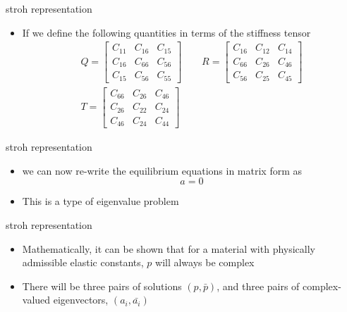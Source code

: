 \documentclass[
  letterpaper,
  ignorenonframetext,
  aspectratio=43,
  handout,
  12pt]{beamer}
\providecommand{\tightlist}{%
  \setlength{\itemsep}{0pt}\setlength{\parskip}{0pt}}
\providecommand{\tightlist}{%
\setlength{\itemsep}{0pt}\setlength{\parskip}{0pt}}
\begin{document}
\begin{frame}{stroh representation}
\protect\hypertarget{stroh-representation-3}{}
\begin{itemize}
\tightlist
\item
  If we define the following quantities in terms of the stiffness tensor
	\[\begin{gathered} Q = \begin{bmatrix}
    C_{11} & C_{16} & C_{15}\\
    C_{16} & C_{66} & C_{56}\\
    C_{15} & C_{56} & C_{55}
  \end{bmatrix} \qquad R = \begin{bmatrix}
    C_{16} & C_{12} & C_{14}\\
    C_{66} & C_{26} & C_{46}\\
    C_{56} & C_{25} & C_{45}
  \end{bmatrix} \\
  T = \begin{bmatrix}
    C_{66} & C_{26} & C_{46}\\
    C_{26} & C_{22} & C_{24}\\
    C_{46} & C_{24} & C_{44}
	\end{bmatrix}\end{gathered}\]
\end{itemize}
\end{frame}

\begin{frame}{stroh representation}
\protect\hypertarget{stroh-representation-4}{}
\begin{itemize}
\item
  we can now re-write the equilibrium equations in matrix form as
  \[a=0\]
\item
  This is a type of eigenvalue problem
\end{itemize}
\end{frame}

\begin{frame}{stroh representation}
\protect\hypertarget{stroh-representation-5}{}
\begin{itemize}
\tightlist
\item
  Mathematically, it can be shown that for a material with physically
  admissible elastic constants, \(p\) will always be complex
\item
  There will be three pairs of solutions \((p,\bar{p})\), and three
  pairs of complex-valued eigenvectors, \((a_i,\bar{a_i})\)
\end{itemize}
\end{frame}
\end{document}
